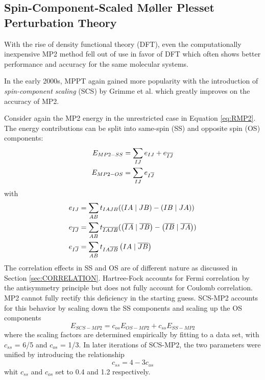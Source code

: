 \subsection{Spin-Component-Scaled M{\o}ller Plesset Perturbation Theory \label{sec:SCSMP2}}

With the rise of density functional theory (DFT), even the computationally inexpensive MP2 method fell out of use in favor of DFT which often shows better performance and accuracy for the same molecular systems.

In the early 2000s, MPPT again gained more popularity with the introduction of \emph{spin-component scaling} (SCS) by Grimme et al. \cite{Gri2003,Gri2012} which greatly improves on the accuracy of MP2.

Consider again the MP2 energy in the unrestricted case in Equation \ref{eq:RMP2}. The energy contributions can be split into same-spin (SS) and opposite spin (OS) components:
\begin{align}
E_{MP2-SS} &= \sum_{IJ} e_{IJ} + e_{\overline{I}\overline{J}} \\
E_{MP2-OS} &= \sum_{IJ} e_{I\overline{J}} 
\end{align}
\noindent with
\begin{align}
e_{IJ} &= \sum_{AB} t_{IAJB} (\left( IA \mid JB \right) - \left( IB \mid JA \right)) \\
e_{\overline{I}\overline{J}} &= \sum_{AB} t_{\overline{I}\overline{A}\overline{J}\overline{B}} (\left( \overline{I}\overline{A} \mid \overline{J}\overline{B} \right) - \left( \overline{I}\overline{B} \mid \overline{J}\overline{A} \right)) \\
e_{I\overline{J}} &= \sum_{AB} t_{IA\overline{J}\overline{B}} \left( IA \mid \overline{J}\overline{B} \right)  
\end{align}
The correlation effects in SS and OS are of different nature as discussed in Section \ref{sec:CORRELATION}. Hartree-Fock accounts for Fermi correlation by the antisymmetry principle but does not fully account for Coulomb correlation. MP2 cannot fully rectify this deficiency in the starting guess. SCS-MP2 accounts for this behavior by scaling down the SS components and scaling up the OS components
\begin{equation}
E_{SCS-MP2} = c_{os} E_{OS-MP2} + c_{ss} E_{SS-MP2}
\end{equation}
\noindent where the scaling factors are determined empirically by fitting to a data set, with $c_{ss}$ = 6/5 and $c_{os}$ = 1/3. In later iterations of SCS-MP2, the two parameters were unified by introducing the relationship
\begin{equation}
c_{ss} = 4 - 3c_{os}
\end{equation}
\noindent whit $c_{ss}$ and $c_{os}$ set to 0.4 and 1.2 respectively.


